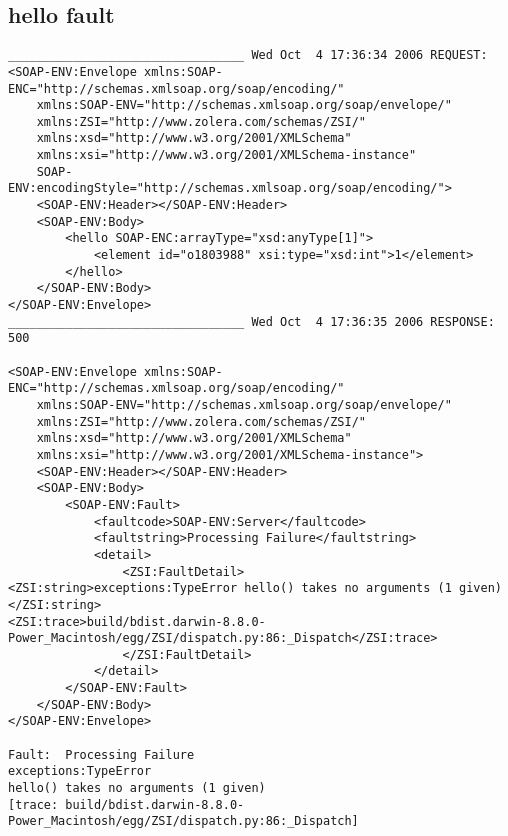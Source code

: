 \subsection{hello fault}
\begin{verbatim}
_________________________________ Wed Oct  4 17:36:34 2006 REQUEST:
<SOAP-ENV:Envelope xmlns:SOAP-ENC="http://schemas.xmlsoap.org/soap/encoding/" 
	xmlns:SOAP-ENV="http://schemas.xmlsoap.org/soap/envelope/" 
	xmlns:ZSI="http://www.zolera.com/schemas/ZSI/" 
	xmlns:xsd="http://www.w3.org/2001/XMLSchema" 
	xmlns:xsi="http://www.w3.org/2001/XMLSchema-instance" 
	SOAP-ENV:encodingStyle="http://schemas.xmlsoap.org/soap/encoding/">
	<SOAP-ENV:Header></SOAP-ENV:Header>
	<SOAP-ENV:Body>
		<hello SOAP-ENC:arrayType="xsd:anyType[1]">
			<element id="o1803988" xsi:type="xsd:int">1</element>
		</hello>
	</SOAP-ENV:Body>
</SOAP-ENV:Envelope>
_________________________________ Wed Oct  4 17:36:35 2006 RESPONSE:
500

<SOAP-ENV:Envelope xmlns:SOAP-ENC="http://schemas.xmlsoap.org/soap/encoding/" 
	xmlns:SOAP-ENV="http://schemas.xmlsoap.org/soap/envelope/" 
	xmlns:ZSI="http://www.zolera.com/schemas/ZSI/" 
	xmlns:xsd="http://www.w3.org/2001/XMLSchema" 
	xmlns:xsi="http://www.w3.org/2001/XMLSchema-instance">
	<SOAP-ENV:Header></SOAP-ENV:Header>
	<SOAP-ENV:Body>
		<SOAP-ENV:Fault>
			<faultcode>SOAP-ENV:Server</faultcode>
			<faultstring>Processing Failure</faultstring>
			<detail>
				<ZSI:FaultDetail>
<ZSI:string>exceptions:TypeError hello() takes no arguments (1 given)</ZSI:string>
<ZSI:trace>build/bdist.darwin-8.8.0-Power_Macintosh/egg/ZSI/dispatch.py:86:_Dispatch</ZSI:trace>
				</ZSI:FaultDetail>
			</detail>
		</SOAP-ENV:Fault>
	</SOAP-ENV:Body>
</SOAP-ENV:Envelope>

Fault:  Processing Failure
exceptions:TypeError
hello() takes no arguments (1 given)
[trace: build/bdist.darwin-8.8.0-Power_Macintosh/egg/ZSI/dispatch.py:86:_Dispatch]
\end{verbatim}

